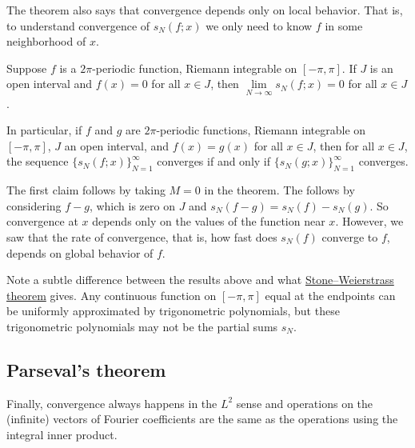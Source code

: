 The theorem also says that convergence depends only on local behavior.
That is, to understand convergence of $s_N(f;x)$ we only need to know
$f$ in some neighborhood of $x$.

\begin{cor}
Suppose $f$ is a $2\pi$-periodic function, Riemann integrable on $[-\pi,\pi]$.
If $J$ is an open interval and $f(x) = 0$ for all $x \in J$,
then $\lim\limits_{N\to\infty} s_N(f;x) = 0$ for all $x \in J$.

In particular, if $f$ and $g$ are $2\pi$-periodic functions,
Riemann integrable on $[-\pi,\pi]$, $J$ an open interval, and $f(x) = g(x)$
for all $x \in J$, then for all $x \in J$,
the sequence
$\bigl\{ s_N(f;x) \bigr\}_{N=1}^\infty$ converges if and only if
$\bigl\{ s_N(g;x) \bigr\}_{N=1}^\infty$ converges.
\end{cor}

The first claim follows by taking $M=0$ in the theorem.
The  follows by considering $f-g$, which
is zero on $J$ and $s_N(f-g) = s_N(f) - s_N(g)$.
So convergence at $x$ depends only on the values of the function
near $x$.
However, we saw that the rate of convergence,
that is, how fast does $s_N(f)$
converge to $f$, depends on global behavior of $f$.

Note a subtle difference between the results above and what 
\hyperref[thm:SWcomplex]{Stone--Weierstrass theorem} gives.
Any continuous function on $[-\pi,\pi]$ equal at the endpoints
can be uniformly approximated
by trigonometric polynomials, but these trigonometric polynomials may
not be the partial sums $s_N$.

\subsection{Parseval's theorem}

Finally,
convergence always happens in the $L^2$ sense and
operations on the (infinite) vectors of
Fourier coefficients are the same as the operations using the integral
inner product.

